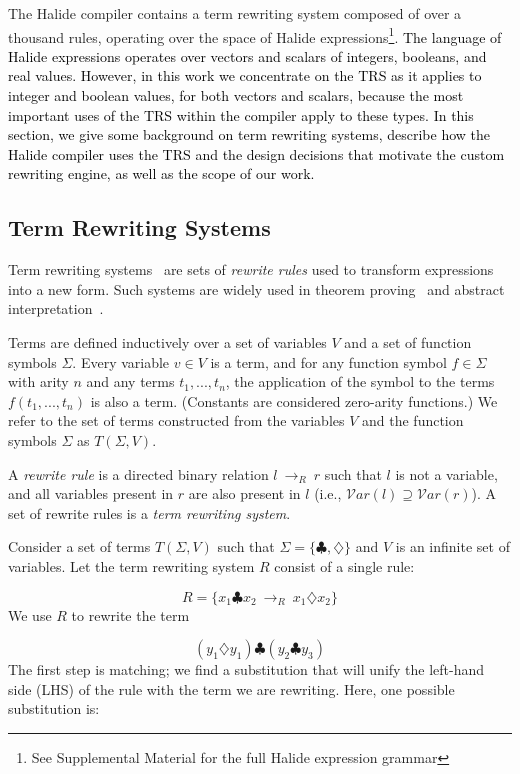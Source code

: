 \documentclass[acmsmall,review]{acmart}\settopmatter{printfolios=true,printccs=false,printacmref=false}
\newcommand{\modified}[1]{\textcolor{black}{{#1}}}
\newcommand{\rewrites}[0]{\:\rightarrow_{R}\:}
\begin{document}
The Halide compiler contains a term rewriting system composed of over a thousand
rules, operating over the space of Halide expressions\footnote{See Supplemental Material for
the full Halide expression grammar}.  \modified{The language of Halide expressions
operates over vectors and scalars of integers, booleans, and real values.  However, in
this work we concentrate on the TRS as it applies to integer and boolean values, for
both vectors and scalars, because the most important uses of the TRS within the compiler
apply to these types.  In this section, we give some background on term rewriting systems,
describe how the Halide compiler uses the TRS
and the design decisions that motivate the custom rewriting engine, as well as the scope
of our work.}

\subsection{Term Rewriting Systems}
Term rewriting systems~\cite{gorn1967} are sets of \textit{rewrite rules} used to transform expressions into a new form.  Such systems are widely
used in theorem proving~\cite{baader1999term} and abstract interpretation~\cite{cousot1977abstract, cousot1979systematic}.

Terms are defined inductively over a set of variables $V$ and a set of function symbols $\Sigma$. Every variable $v \in V$ is a term, and for any function symbol $f \in \Sigma$ with arity $n$ and any terms $t_1, ..., t_n$, the application of the symbol to the terms $f(t_1, ..., t_n)$ is also a term. (Constants are considered zero-arity functions.) We refer to the set of terms constructed from the variables $V$ and the function symbols $\Sigma$ as $T(\Sigma, V)$.

A \emph{rewrite rule} is a directed binary relation $l \rewrites r$ such that $l$ is not a variable, and all variables present in $r$ are also present in $l$ (i.e., $\mathcal{V}ar(l) \supseteq \mathcal{V}ar(r)$). A set of rewrite rules is a \emph{term rewriting system}.

Consider a set of terms $T(\Sigma, V)$ such that $\Sigma = \{\clubsuit, \diamondsuit\}$ and $V$ is an infinite set of variables. Let the term rewriting system $R$ consist of a single rule:

\[ R = \{ x_1 \clubsuit x_2 \rewrites x_1 \diamondsuit x_2 \} \]
We use $R$ to rewrite the term

\[ 
(y_1 \diamondsuit y_1) \clubsuit (y_2 \clubsuit y_3)
\]
The first step is matching; we find a substitution that will unify the left-hand side (LHS) of the rule with the term we are rewriting. Here, one possible substitution is:
\end{document}
